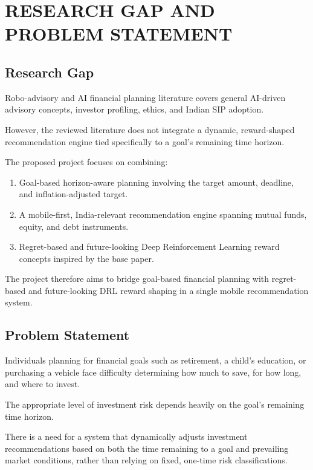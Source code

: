 \chapter{\uppercase{Research Gap and Problem Statement}}

\section{Research Gap}
Robo-advisory and AI financial planning literature covers general AI-driven advisory concepts, investor profiling, ethics, and Indian SIP adoption.

However, the reviewed literature does not integrate a dynamic, reward-shaped recommendation engine tied specifically to a goal's remaining time horizon.

The proposed project focuses on combining:
\begin{enumerate}
	\item Goal-based horizon-aware planning involving the target amount, deadline, and inflation-adjusted target.
	\item A mobile-first, India-relevant recommendation engine spanning mutual funds, equity, and debt instruments.
	\item Regret-based and future-looking Deep Reinforcement Learning reward concepts inspired by the base paper.
\end{enumerate}
The project therefore aims to bridge goal-based financial planning with regret-based and future-looking DRL reward shaping in a single mobile recommendation system.

\section{Problem Statement}
Individuals planning for financial goals such as retirement, a child's education, or purchasing a vehicle face difficulty determining how much to save, for how long, and where to invest.

The appropriate level of investment risk depends heavily on the goal's remaining time horizon.

There is a need for a system that dynamically adjusts investment recommendations based on both the time remaining to a goal and prevailing market conditions, rather than relying on fixed, one-time risk classifications.
